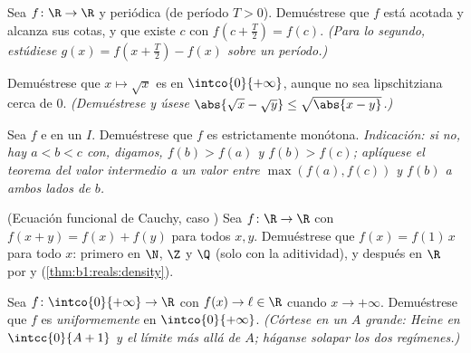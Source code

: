 \begin{exercise}[$\star\star$]\label{exo:b1:continuity:8}
Sea $f \colon \R \to \R$  y periódica (de período
$T > 0$). Demuéstrese que $f$ está acotada y alcanza sus cotas, y que
existe $c$ con $f(c + \frac T2) = f(c)$. \emph{(Para lo segundo,
estúdiese $g(x) = f(x + \frac T2) - f(x)$ sobre un período.)}
\end{exercise}

\begin{exercise}[$\star\star$]\label{exo:b1:continuity:9}
Demuéstrese que $x \mapsto \sqrt x$ es  en
$\intco{0}{+\infty}$, aunque no sea lipschitziana cerca de $0$.
\emph{(Demuéstrese y úsese $\abs{\sqrt x - \sqrt y} \leq \sqrt{\abs{x -
y}}$.)}
\end{exercise}

\begin{exercise}[$\star\star\star$]\label{exo:b1:continuity:10}
Sea $f$  e  en un  $I$. Demuéstrese que
$f$ es estrictamente monótona. \emph{Indicación: si no, hay
$a < b < c$ con, digamos, $f(b) > f(a)$ y $f(b) > f(c)$; aplíquese el
teorema del valor intermedio a un valor entre $\max(f(a), f(c))$ y
$f(b)$ a ambos lados de $b$.}
\end{exercise}

\begin{exercise}[$\star\star\star$]\label{exo:b1:continuity:11}
(Ecuación funcional de Cauchy, caso ) Sea
$f \colon \R \to \R$  con $f(x + y) = f(x) + f(y)$ para
todos $x, y$. Demuéstrese que $f(x) = f(1)\,x$ para todo $x$: primero
en $\N$, $\Z$ y $\Q$ (solo con la aditividad), y después en $\R$ por
 y  (\cref{thm:b1:reals:density}).
\end{exercise}

\begin{exercise}[$\star\star\star$]\label{exo:b1:continuity:12}
Sea $f \colon \intco{0}{+\infty} \to \R$  con
$f(x) \to \ell \in \R$ cuando $x \to +\infty$. Demuéstrese que $f$ es
\emph{uniformemente}  en $\intco{0}{+\infty}$. \emph{(Córtese
en un $A$ grande: Heine en $\intcc{0}{A+1}$ y el límite más allá de
$A$; háganse solapar los dos regímenes.)}
\end{exercise}

